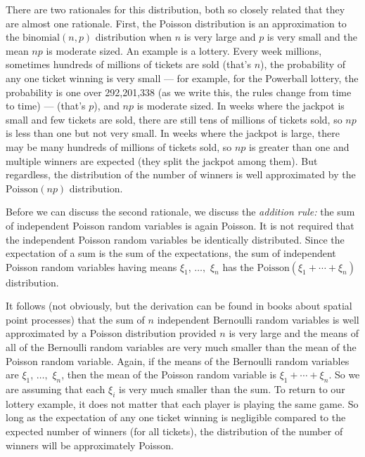 There are two rationales for this distribution, both so closely related
that they are almost one rationale.  First, the Poisson distribution is
an approximation to the $\text{binomial}(n, p)$ distribution when $n$
is very large and $p$ is very small and the mean $n p$ is moderate sized.
An example is a lottery.  Every week millions, sometimes hundreds of millions
of tickets are sold (that's $n$), the probability of any one ticket winning
is very small --- for example, for the Powerball lottery, the probability is
one over 292,201,338 (as we write this, the rules change from time to time) ---
(that's $p$), and $n p$ is moderate sized.  In weeks where the jackpot is small
and few tickets are sold, there are still tens of millions of tickets sold,
so $n p$ is less than one but not very small.  In weeks where the jackpot
is large, there may be many hundreds of millions
of tickets sold, so $n p$ is greater
than one and multiple winners are expected (they split the jackpot among them).
But regardless, the distribution of the number of winners is well approximated
by the $\text{Poisson}(n p)$ distribution.

Before we can discuss the second rationale, we discuss the \emph{addition rule:}
the sum of independent Poisson random variables is again Poisson.
It is not required that the independent Poisson random variables be
identically distributed.  Since the expectation of a sum is the sum of the
expectations, the sum of independent Poisson random variables having
means $\xi_1$, $\ldots,$ $\xi_n$ has
the $\text{Poisson}(\xi_1 + \cdots + \xi_n)$ distribution.

It follows (not obviously, but the derivation can be found in books
about spatial point processes) that the sum of $n$ independent Bernoulli
random variables is well approximated by a Poisson distribution provided
$n$ is very large and the means of all of the Bernoulli random variables
are very much smaller than the mean of the Poisson random variable.
Again, if the means of the Bernoulli random variables
are $\xi_1$, $\ldots,$ $\xi_n$, then the mean of the Poisson random variable
is $\xi_1 + \cdots + \xi_n$.  So we are assuming that each $\xi_i$ is very
much smaller than the sum.  To return to our lottery example, it does not
matter that each player is playing the same game.  So long as the expectation
of any one ticket winning is negligible compared to the expected number of
winners (for all tickets), the distribution of the number of winners will
be approximately Poisson.

